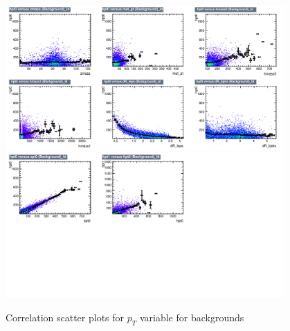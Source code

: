 \begin{figure}[!htb]%
\centering
\includegraphics[width=0.95\textwidth]{figures/CRDY/dataset/plots/correlationscatter_hpt0__Id_c3.pdf}
\includegraphics[width=0.95\textwidth]{figures/CRDY/dataset/plots/correlationscatter_hpt0__Id_c4.pdf}
\caption{ Correlation scatter plots for \HZZ $p_{T}$ variable for backgrounds}%
\label{fig:correlations_CRDY_hpt0_BG}                                                       
\end{figure}


